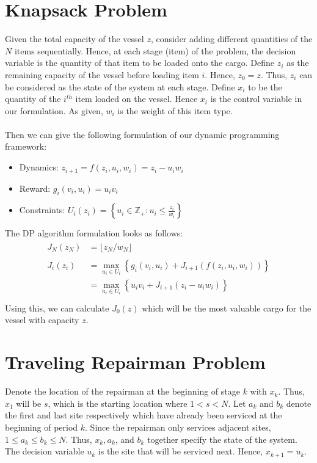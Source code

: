 \documentclass[11pt, oneside]{article}   	%
\begin{document}
\section{Knapsack Problem}

Given the total capacity of the vessel $z$, consider adding different quantities of the $N$ items sequentially. Hence, at each stage (item) of the problem, the decision variable is the quantity of that item to be loaded onto the cargo. Define $z_i$ as the remaining capacity of the vessel before loading item $i$. Hence, $z_0 = z$. Thus, $z_i$ can be considered as the state of the system at each stage. Define $x_i$ to be the quantity of the $i^{th}$ item loaded on the vessel. Hence $x_i$ is the control variable in our formulation. As given, $w_i$ is the weight of this item type.\\\\
Then we can give the following formulation of our dynamic programming framework:
\begin{itemize}
\item Dynamics: $z_{i+1} = f(z_i,u_i,w_i) = z_i - u_i w_i$
\item Reward: $g_i(v_i, u_i) = u_i v_i$
\item Constraints: $U_i(z_i) = \left\{ u_i \in \mathbb{Z}_+ : u_i \leq \frac{z_i}{w_i} \right\}$
\end{itemize}
The DP algorithm formulation looks as follows:
\begin{align}
\begin{split}
J_{N}(z_{N}) &= \lfloor{z_N/w_N}\rfloor
\\\\
J_i(z_i) &= \max_{u_i \in U_i} \left\{ g_i(v_i, u_i) + J_{i+1}(f(z_i, u_i, w_i)) \right\}\\
&= \max_{u_i \in U_i} \left\{ u_i v_i + J_{i+1}(z_i - u_i w_i) \right\}\\
\end{split}
\end{align}
Using this, we can calculate $J_0(z)$ which will be the most valuable cargo for the vessel with capacity $z$.


\section{Traveling Repairman Problem}

Denote the location of the repairman at the beginning of stage $k$ with $x_k$. Thus, $x_1$ will be $s$, which is the starting location where $1 < s < N$. Let $a_k$ and $b_k$ denote the first and last site respectively which have already been serviced at the beginning of period $k$. Since the repairman only services adjacent sites, $1 \leq a_k \leq b_k \leq N$. Thus, $x_k, a_k$, and $b_k$ together specify the state of the system. The decision variable $u_k$ is the site that will be serviced next. Hence, $x_{k+1} = u_k$.
\end{document}
